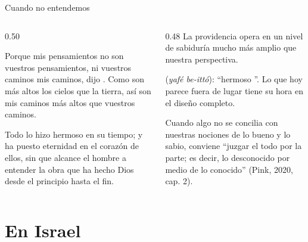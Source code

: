 \begin{frame}{Cuando no entendemos}
\begin{columns}[t,onlytextwidth]
\begin{column}{0.50\textwidth}
\begin{cita}Porque mis pensamientos no son vuestros pensamientos, ni vuestros caminos mis caminos, dijo \SENOR. Como son más altos los cielos que la tierra, así son mis caminos más altos que vuestros caminos.\end{cita}
\begin{cita}Todo lo hizo hermoso en su tiempo; y ha puesto eternidad en el corazón de ellos, sin que alcance el hombre a entender la obra que ha hecho Dios desde el principio hasta el fin.\end{cita}
\end{column}
\begin{column}{0.48\textwidth}\small
La providencia opera en un nivel de sabiduría mucho más amplio que nuestra perspectiva.\par\medskip
{} (\emph{yafé be-ittó}): ``hermoso ''. Lo que hoy parece fuera de lugar tiene su hora en el diseño completo.\par\medskip
Cuando algo no se concilia con nuestras nociones de lo bueno y lo sabio, conviene ``juzgar el todo por la parte; es decir, lo desconocido por medio de lo conocido'' (Pink, 2020, cap. 2).
\end{column}
\end{columns}
\end{frame}

\section{En Israel}

